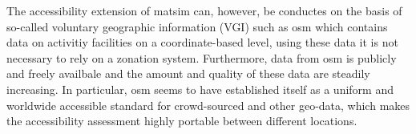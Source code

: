 The accessibility extension of \gls{matsim} can, however, be conductes on the basis of so-called voluntary
geographic information (VGI) such as \gls{osm}
which contains data on activitiy facilities on a coordinate-based 
level, \ie using these data it is not necessary to rely on a zonation
system. Furthermore, data from \gls{osm} is publicly and freely availbale and the amount and quality of these
data are steadily increasing. In particular, \gls{osm} seems to have established itself as a uniform and worldwide 
accessible standard for crowd-sourced and other geo-data, which makes the accessibility assessment highly portable
between different locations.

%
